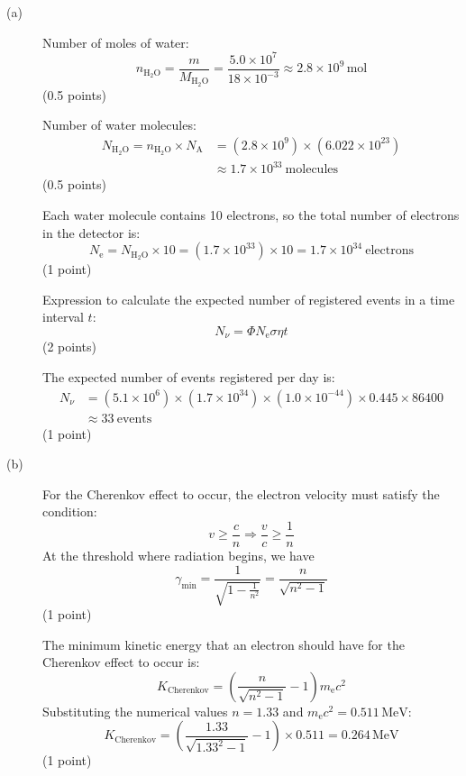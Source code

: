 \begin{description}
\item[(a)] Number of moles of water:
  \[ n_{\mathrm{H_2O}} = \frac{m}{M_{\mathrm{H_2O}}}
     = \frac{5.0 \times 10^7}{18 \times 10^{-3}}
     \approx 2.8 \times 10^9\,\mathrm{mol} \]
  \hfill(0.5 points)

  Number of water molecules:
  \begin{align*}
    N_{\mathrm{H_2O}} = n_{\mathrm{H_2O}} \times N_{\mathrm{A}}
      &= (2.8 \times 10^9) \times (6.022 \times 10^{23}) \\
      &\approx 1.7 \times 10^{33}\ \mathrm{molecules}
  \end{align*}
  \hfill(0.5 points)

  Each water molecule contains 10 electrons, so the total number of electrons
  in the detector is:
  \[ N_{\mathrm{e}} = N_{\mathrm{H_2O}} \times 10
     = (1.7 \times 10^{33}) \times 10 = 1.7 \times 10^{34}\ \mathrm{electrons} \]
  \hfill(1 point)

  Expression to calculate the expected number of registered events in a time
  interval $t$:
  \[ N_\nu = \Phi N_{\mathrm{e}} \sigma \eta t \]
  \hfill(2 points)

  The expected number of events registered per day is:
  \begin{align*}
    N_\nu &= (5.1 \times 10^6) \times (1.7 \times 10^{34})
             \times (1.0 \times 10^{-44}) \times 0.445 \times 86400 \\
          &\approx 33\ \mathrm{events}
  \end{align*}
  \hfill(1 point)

\item[(b)] For the Cherenkov effect to occur, the electron velocity must
  satisfy the condition:
  \[ v \ge \frac{c}{n} \Longrightarrow \frac{v}{c} \ge \frac{1}{n} \]
  At the threshold where radiation begins, we have
  \[ \gamma_{\mathrm{min}} = \frac{1}{\sqrt{1 - \frac{1}{n^2}}}
     = \frac{n}{\sqrt{n^2 - 1}} \]
  \hfill(1 point)

  The minimum kinetic energy that an electron should have for the Cherenkov
  effect to occur is:
  \[ K_{\mathrm{Cherenkov}} = \left(\frac{n}{\sqrt{n^2 - 1}} - 1\right)
     m_{\mathrm{e}}c^2 \]
  Substituting the numerical values $n = 1.33$ and
  $m_{\mathrm{e}}c^2 = 0.511\,\mathrm{MeV}$:
  \[ K_{\mathrm{Cherenkov}} = \left(\frac{1.33}{\sqrt{1.33^2 - 1}} - 1\right)
     \times 0.511 = 0.264\,\mathrm{MeV} \]
  \hfill(1 point)


\end{description}
